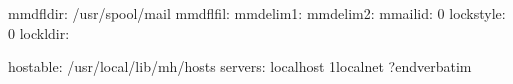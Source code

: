
\verbatim
mmdfldir:       /usr/spool/mail
mmdflfil:
mmdelim1:       \n
mmdelim2:       \n
mmailid:        0
lockstyle:      0
lockldir:

hostable:       /usr/local/lib/mh/hosts
servers:        localhost \01localnet
?endverbatim
